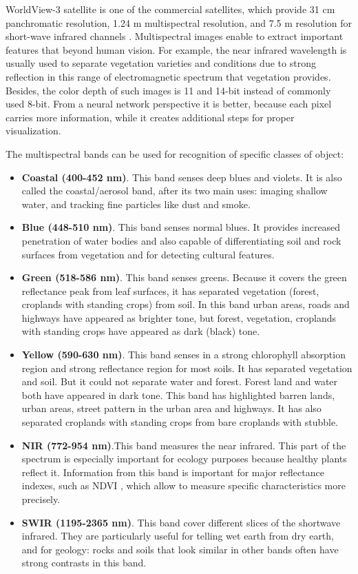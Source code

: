 \documentclass[10pt,twocolumn,letterpaper]{article}
\begin{document}
WorldView-3 satellite is one of the commercial satellites, which provide 31 cm panchromatic resolution, 1.24 m multispectral resolution, and 7.5 m resolution for short-wave infrared channels \cite{bands}. Multispectral images enable to extract important features that beyond human vision. For example, the near infrared wavelength is usually used to separate vegetation varieties and conditions due to strong reflection in this range of electromagnetic spectrum that vegetation provides. Besides, the color depth of such images is 11 and 14-bit instead of commonly used 8-bit. From a neural network perspective it is better, because each pixel carries more information, while it creates additional steps for proper visualization.

The multispectral bands can be used for recognition of specific classes of object:

\begin{itemize}
	\item \textbf{Coastal (400-452 nm)}. This band senses deep blues and violets.
	 It is also called the coastal/aerosol band, after its two main uses: imaging shallow water, and tracking fine particles like dust and smoke.

	\item \textbf{Blue (448-510 nm)}. This band senses normal blues. It provides increased penetration of water bodies and also capable of differentiating soil and rock surfaces from vegetation and for detecting cultural features.

	\item \textbf{Green (518-586 nm)}. This band senses greens. Because it covers the green reflectance peak from leaf surfaces, it has separated vegetation (forest, croplands with standing crops) from soil. In this band urban areas, roads and highways have appeared as brighter tone, but forest, vegetation, croplands with standing crops have appeared as dark (black) tone.

	\item \textbf{Yellow (590-630 nm)}. This band senses in a strong chlorophyll absorption region and strong reflectance region for most soils. It has separated vegetation and soil. But it could not separate water and forest. Forest land and water both have appeared in dark tone. This band has highlighted barren lands, urban areas, street pattern in the urban area and highways. It has also separated croplands with standing crops from bare croplands with stubble.

	\item \textbf{NIR (772-954 nm)}.This band measures the near infrared. This part of the spectrum is especially important for ecology purposes because healthy plants reflect it. Information from this band is important for major reflectance indexes, such as NDVI \cite{ndvi}, which allow to measure specific characteristics more precisely.

	\item \textbf{SWIR (1195-2365 nm)}. This band cover different slices of the shortwave infrared. They are particularly useful for telling wet earth from dry earth, and for geology: rocks and soils that look similar in other bands often have strong contrasts in this band.
\end{itemize}
\end{document}
